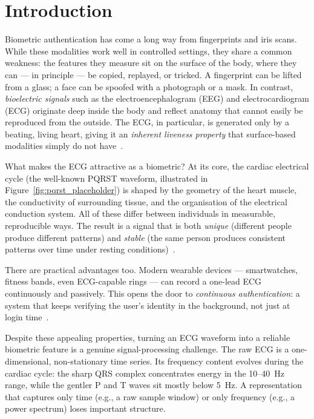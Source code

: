 \documentclass[12pt, a4paper]{article}
\begin{document}
\vspace{10pt}

\section{Introduction}

Biometric authentication has come a long way from fingerprints and iris
scans. While these modalities work well in controlled settings, they share
a common weakness: the features they measure sit on the surface of the body,
where they can --- in principle --- be copied, replayed, or tricked.
A fingerprint can be lifted from a glass; a face can be spoofed with a
photograph or a mask.
In contrast, \textit{bioelectric signals} such as the
electroencephalogram (EEG) and electrocardiogram (ECG) originate deep inside
the body and reflect anatomy that cannot easily be reproduced from the outside.
The ECG, in particular, is generated only by a beating, living heart, giving
it an \textit{inherent liveness property} that surface-based modalities simply
do not have~\cite{he2022,byeon2019}.

What makes the ECG attractive as a biometric? At its core, the cardiac
electrical cycle (the well-known PQRST waveform, illustrated in
Figure~\ref{fig:pqrst_placeholder}) is shaped by the geometry of the heart
muscle, the conductivity of surrounding tissue, and the organisation of the
electrical conduction system. All of these differ between individuals in
measurable, reproducible ways. The result is a signal that is both
\textit{unique} (different people produce different patterns) and
\textit{stable} (the same person produces consistent patterns over time
under resting conditions)~\cite{he2022}.

There are practical advantages too. Modern wearable devices --- smartwatches,
fitness bands, even ECG-capable rings --- can record a one-lead ECG
continuously and passively.
This opens the door to \textit{continuous authentication}: a system that
keeps verifying the user's identity in the background, not just at login
time~\cite{bhuva2023}.

Despite these appealing properties, turning an ECG waveform into a reliable
biometric feature is a genuine signal-processing challenge.
The raw ECG is a one-dimensional, non-stationary time series. Its
frequency content evolves during the cardiac cycle: the sharp QRS complex
concentrates energy in the 10--40~Hz range, while the gentler P and T waves
sit mostly below 5~Hz. A representation that captures only time (e.g., a raw
sample window) or only frequency (e.g., a power spectrum) loses important
structure.
\end{document}
